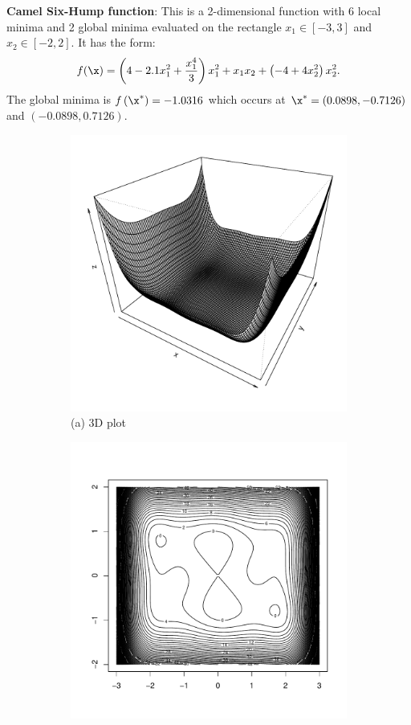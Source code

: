 \documentclass [PhD] {package/uclathes}
\begin{document}
\textbf{Camel Six-Hump function}: This is a 2-dimensional function with 6 local minima and 2 global minima evaluated on the rectangle $x_1\in [-3,3]$ and $x_2\in [-2,2]$. It has the form:
$$
f(\x)=\left(4-2.1 x_1^2+\frac{x_1^4}{3}\right) x_1^2+x_1 x_2+\left(-4+4 x_2^2\right) x_2^2.
$$
The global minima is $f\left(\x^*\right)=-1.0316$ which occurs at  $\x^*=(0.0898,-0.7126)$ and $(-0.0898,0.7126)$.

\begin{figure}%
\centering
\begin{subfigure}[b]{0.4\textwidth}
\centering
\includegraphics[width=\textwidth]{chapters/EGO/pdfs/camel6_fun}
\caption*{(a) 3D plot}
\end{subfigure}
\hfill
\begin{subfigure}[b]{0.4\textwidth}
\centering
\includegraphics[width=\textwidth]{chapters/EGO/pdfs/camel6_contour}

\end{subfigure}
\end{figure}
\end{document}
